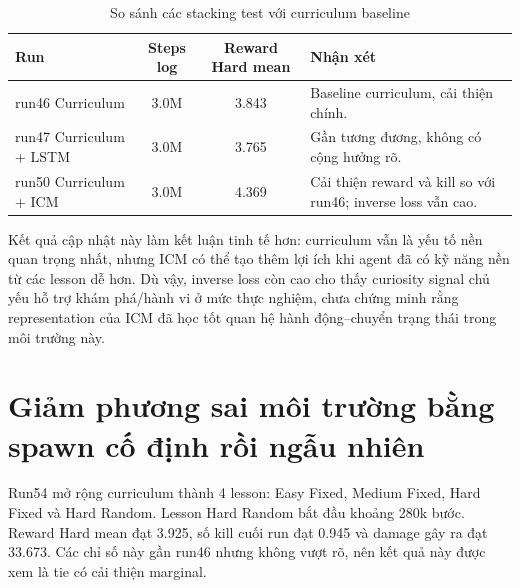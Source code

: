 \begin{table}[H]
    \centering
    \small
    \caption{So sánh các stacking test với curriculum baseline}
    \label{tab:stacking_tests}
    \begin{tabular}{|p{4.4cm}|c|c|p{4.8cm}|}
        \hline
        \textbf{Run} & \textbf{Steps log} & \textbf{Reward Hard mean} & \textbf{Nhận xét} \\
        \hline
        run46 Curriculum & 3.0M & 3.843 & Baseline curriculum, cải thiện chính. \\
        \hline
        run47 Curriculum + LSTM & 3.0M & 3.765 & Gần tương đương, không có cộng hưởng rõ. \\
        \hline
        run50 Curriculum + ICM & 3.0M & 4.369 & Cải thiện reward và kill so với run46; inverse loss vẫn cao. \\
        \hline
    \end{tabular}
\end{table}

Kết quả cập nhật này làm kết luận tinh tế hơn: curriculum vẫn là yếu tố nền quan trọng nhất, nhưng ICM có thể tạo thêm lợi ích khi agent đã có kỹ năng nền từ các lesson dễ hơn. Dù vậy, inverse loss còn cao cho thấy curiosity signal chủ yếu hỗ trợ khám phá/hành vi ở mức thực nghiệm, chưa chứng minh rằng representation của ICM đã học tốt quan hệ hành động--chuyển trạng thái trong môi trường này.

\section{Giảm phương sai môi trường bằng spawn cố định rồi ngẫu nhiên}

Run54 mở rộng curriculum thành 4 lesson: Easy Fixed, Medium Fixed, Hard Fixed và Hard Random. Lesson Hard Random bắt đầu khoảng 280k bước. Reward Hard mean đạt 3.925, số kill cuối run đạt 0.945 và damage gây ra đạt 33.673. Các chỉ số này gần run46 nhưng không vượt rõ, nên kết quả này được xem là tie có cải thiện marginal.

